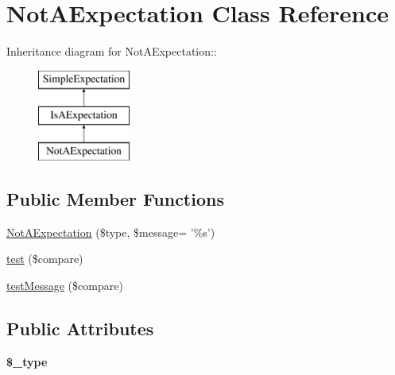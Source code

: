\hypertarget{class_not_a_expectation}{
\section{NotAExpectation Class Reference}
\label{class_not_a_expectation}
}
Inheritance diagram for NotAExpectation::\begin{figure}[H]
\begin{center}
\leavevmode
\includegraphics[height=3cm]{class_not_a_expectation}
\end{center}
\end{figure}
\subsection*{Public Member Functions}
\begin{DoxyCompactItemize}
\item 
\hyperlink{class_not_a_expectation_ac5376f9e05d830a311ca7cae4beb2af8}{NotAExpectation} (\$type, \$message= '\%s')
\item 
\hyperlink{class_not_a_expectation_a627e4e3a4514de8f869eaa5f62a5e206}{test} (\$compare)
\item 
\hyperlink{class_not_a_expectation_aecc6099e1b98a0b00f798e43a8add4fa}{testMessage} (\$compare)
\end{DoxyCompactItemize}
\subsection*{Public Attributes}
\begin{DoxyCompactItemize}
\item 
\hypertarget{class_not_a_expectation_a87065cc077783de6b169d3d2fac0a594}{
{\bfseries \$\_\-type}}
\label{class_not_a_expectation_a87065cc077783de6b169d3d2fac0a594}

\end{DoxyCompactItemize}


